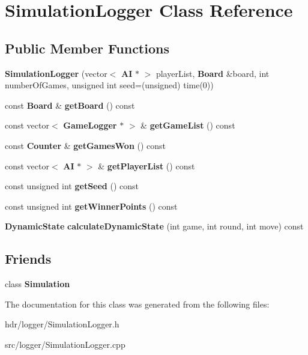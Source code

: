 \section{Simulation\-Logger Class Reference}
\label{class_simulation_logger}
\subsection*{Public Member Functions}
\begin{DoxyCompactItemize}
\item 
{\bfseries Simulation\-Logger} (vector$<$ {\bf A\-I} $\ast$ $>$ player\-List, {\bf Board} \&board, int number\-Of\-Games, unsigned int seed=(unsigned) time(0))\label{class_simulation_logger_a1bd6ad9e03211cee83757c567c14195b}

\item 
const {\bf Board} \& {\bfseries get\-Board} () const \label{class_simulation_logger_a5ed89aaa870ff9323be5f8f82da95f4a}

\item 
const vector$<$ {\bf Game\-Logger} $\ast$ $>$ \& {\bfseries get\-Game\-List} () const \label{class_simulation_logger_af92f6d16f918a385ccfa0d9b6a8823b3}

\item 
const {\bf Counter} \& {\bfseries get\-Games\-Won} () const \label{class_simulation_logger_a1a8d238597cef51d85bef2cd397bfb4d}

\item 
const vector$<$ {\bf A\-I} $\ast$ $>$ \& {\bfseries get\-Player\-List} () const \label{class_simulation_logger_ac089019f8358d4bb5bb5d92504e40ca4}

\item 
const unsigned int {\bfseries get\-Seed} () const \label{class_simulation_logger_ac9f1225d9d932eb90ccdde1c4149d212}

\item 
const unsigned int {\bfseries get\-Winner\-Points} () const \label{class_simulation_logger_af90bd066ae1f1012384f87662f19eb8f}

\item 
{\bf Dynamic\-State} {\bfseries calculate\-Dynamic\-State} (int game, int round, int move) const \label{class_simulation_logger_a1929c74a77d05af475b262b65acc4258}

\end{DoxyCompactItemize}
\subsection*{Friends}
\begin{DoxyCompactItemize}
\item 
class {\bfseries Simulation}\label{class_simulation_logger_aeb51e0a4c44d4192cfbdb79598859172}

\end{DoxyCompactItemize}


The documentation for this class was generated from the following files\-:\begin{DoxyCompactItemize}
\item 
hdr/logger/Simulation\-Logger.\-h\item 
src/logger/Simulation\-Logger.\-cpp\end{DoxyCompactItemize}
